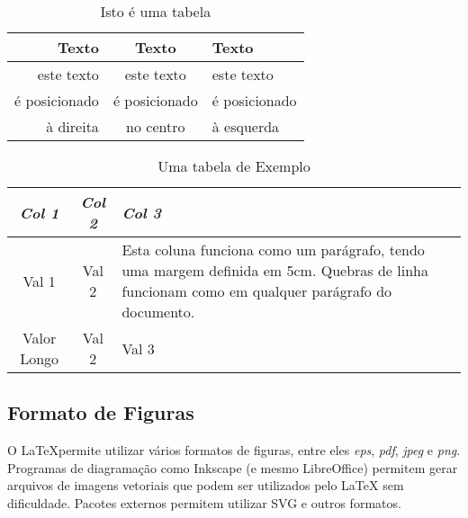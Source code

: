 \begin{table}[h]
    \caption{Isto é uma tabela}
    \centering
    \begin{tabular}{|r|c|l|}
        \hline
        Texto         & Texto         & Texto         \\ \hline
        este texto    & este texto    & este texto    \\
        é posicionado & é posicionado & é posicionado \\
        à direita     & no centro     & à esquerda    \\ \hline
    \end{tabular}
    \label{tab-isto-e-uma-tabela}
\end{table}


\begin{table}[t]
    \caption{Uma tabela de Exemplo}
    \begin{center}
        \begin{tabular}{c|c|p{5cm}}
            \textit{Col 1} & \textit{Col 2} & \textit{Col 3}                                                                                                                                \\
            \hline
            \hline
            Val 1          & Val 2          & Esta coluna funciona como um parágrafo, tendo uma margem definida em 5cm. Quebras de linha funcionam como em qualquer parágrafo do documento. \\
            Valor Longo    & Val 2          & Val 3                                                                                                                                         \\
            \hline
        \end{tabular}
    \end{center}
    \label{tab-tabela-exemplo}
\end{table}

\subsection{Formato de Figuras}
\label{sec:fig_format}

O \LaTeX permite utilizar vários formatos de figuras, entre eles \emph{eps}, \emph{pdf}, \emph{jpeg} e \emph{png}. Programas de diagramação como Inkscape (e mesmo LibreOffice) permitem gerar arquivos de imagens vetoriais que podem ser utilizados pelo LaTeX sem dificuldade. Pacotes externos permitem utilizar SVG e outros formatos.

